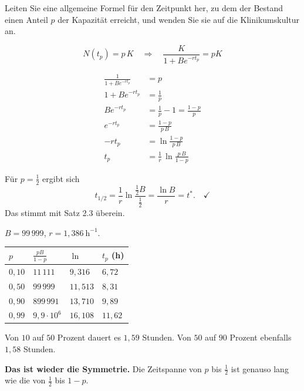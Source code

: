 \begin{aufgabe}
Leiten Sie eine allgemeine Formel für den Zeitpunkt her, zu dem der Bestand einen Anteil $p$ der Kapazität erreicht, und wenden Sie sie auf die Klinikumskultur an.

\loesung
{}
\[ N(t_p) = p\,K \quad\Longrightarrow\quad \frac{K}{1+Be^{-rt_p}} = pK \]

\begin{align*}
\frac{1}{1+Be^{-rt_p}} &= p\\
1+Be^{-rt_p} &= \frac{1}{p}\\
Be^{-rt_p} &= \frac{1}{p} - 1 = \frac{1-p}{p}\\
e^{-rt_p} &= \frac{1-p}{p\,B}\\
-rt_p &= \ln\frac{1-p}{p\,B}\\
t_p &= \frac{1}{r}\,\ln\frac{p\,B}{1-p}
\end{align*}

Für $p = \frac12$ ergibt sich
\[ t_{1/2} = \frac{1}{r}\ln\frac{\frac12 B}{\frac12} = \frac{\ln B}{r} = t^{*} . \quad \checkmark \]
Das stimmt mit Satz 2.3 überein.

$B = 99\,999$, $r = 1{,}386\ \mathrm{h}^{-1}$.
\begin{center}
{\small
\renewcommand{\arraystretch}{1.45}
\begin{tabular}{@{}P{1.4cm}P{2.6cm}P{2.2cm}P{1.8cm}@{}}
\toprule
$p$ & $\frac{pB}{1-p}$ & $\ln$ & $t_p$ (h)\\
\midrule
$0{,}10$ & $11\,111$ & $9{,}316$ & $6{,}72$\\
$0{,}50$ & $99\,999$ & $11{,}513$ & $8{,}31$\\
$0{,}90$ & $899\,991$ & $13{,}710$ & $9{,}89$\\
$0{,}99$ & $9{,}9\cdot10^{6}$ & $16{,}108$ & $11{,}62$\\
\bottomrule
\end{tabular}}
\end{center}

Von $10$ auf $50$ Prozent dauert es $1{,}59$ Stunden. Von $50$ auf $90$ Prozent ebenfalls $1{,}58$ Stunden.

\begin{center}
\begin{minipage}{0.9\textwidth}
\textbf{Das ist wieder die Symmetrie.} Die Zeitspanne von $p$ bis $\frac12$ ist genauso lang wie die von $\frac12$ bis $1-p$.
\end{minipage}
\end{center}


\end{aufgabe}
